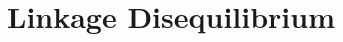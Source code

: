 \documentclass[a4paper,11pt]{article}
\begin{document}


\section{Linkage Disequilibrium}\label{sec:LinkageDisequilibrium}
\end{document}
